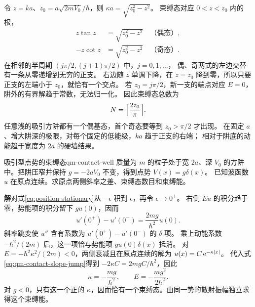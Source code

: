 令 $z = ka$、$z_0 = a\sqrt{2mV_0}/\hbar$，则 $\kappa a = \sqrt{z_0^2 - z^2}$。
束缚态对应 $0 < z < z_0$ 内的根，
\begin{subequations}\label{eq:finite-well-parity}
    \begin{align}
        z\tan z &= \sqrt{z_0^2 - z^2}\quad\text{（偶态）},\\
        -z\cot z &= \sqrt{z_0^2 - z^2}\quad\text{（奇态）}.
    \end{align}
\end{subequations}
在相邻的半周期 $(j\pi/2,(j + 1)\pi/2)$ 中，$j = 0,1,\ldots$，
偶、奇两式的左边交替有一条从零递增到无穷的正支。
右边随 $z$ 单调下降，在 $z = z_0$ 降到零，所以只要正支的左端小于 $z_0$，就恰有一个交点。
若 $z_0 = j\pi/2$，新一支的端点对应 $E = 0$，阱外的有界解趋于常数，无法归一化。
因此束缚态总数为
\begin{equation}
    N = \Bigl\lceil\frac{2z_0}{\pi}\Bigr\rceil .
\end{equation}
任意浅的吸引方阱都有一个偶基态，首个奇态要等到 $z_0 > \pi/2$ 才出现。
在固定 $a$、增大阱深的极限，对每个固定的低能级，$ka$ 趋于正支的右端；
相对于阱底的动能趋于宽度为 $2a$ 的硬墙结果\cite{mitwave}。

\begin{example}{吸引型点势的束缚态}{qm-contact-well}
    质量为 $m$ 的粒子处于宽 $2a$、深 $V_0$ 的方阱中。把阱压窄并保持 $g = -2aV_0$ 不变，得到点势 $V(x) = g\delta(x)$。
    已知波函数 $u$ 在原点连续。求原点两侧斜率之差、束缚态数目和束缚能。

    \par\smallskip\textbf{解}\quad 对式\eqref{eq:position-stationary}从 $-\epsilon$ 积到 $\epsilon$，再令 $\epsilon \to 0^+$。
    右侧 $Eu$ 的积分趋于零，势能项的积分留下 $g u(0)$，因而
    \begin{equation}
        u'(0^+) - u'(0^-) = \frac{2mg}{\hbar^2}u(0).
        \label{eq:qm-contact-slope-jump}
    \end{equation}
    斜率跳变使 $u''$ 含有系数为 $u'(0^+) - u'(0^-)$ 的 $\delta$ 项。
    乘上动能系数 $-\hbar^2/(2m)$ 后，这一项恰与势能项 $g u(0)\delta(x)$ 抵消。
    对 $E = -\hbar^2\kappa^2/(2m) < 0$，两侧衰减且在原点连续的解为 $u(x) = C\mathop{}\!\mathrm{e}^{-\kappa\lvert x\rvert}$。
    代入式\eqref{eq:qm-contact-slope-jump}得到 $-2\kappa C = 2mgC/\hbar^2$，因此
    \begin{equation}
        \kappa = -\frac{mg}{\hbar^2},\qquad E = -\frac{mg^2}{2\hbar^2}.
    \end{equation}
    对 $g < 0$，只有这一个正的 $\kappa$，因而恰有一个束缚态。由同一势的散射振幅独立求得这个束缚能。
\end{example}


